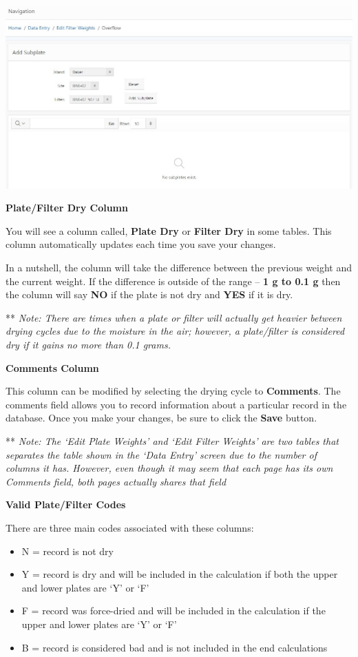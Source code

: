 \documentclass[]{book}
\providecommand{\tightlist}{%
  \setlength{\itemsep}{0pt}\setlength{\parskip}{0pt}}
\begin{document}
\includegraphics{images/Data6.jpg}

\textbf{Plate/Filter Dry Column}

You will see a column called, \textbf{Plate Dry} or \textbf{Filter Dry} in some tables. This column automatically updates each time you save your changes.

In a nutshell, the column will take the difference between the previous weight and the current weight. If the difference is outside of the range -- \textbf{1 g to 0.1 g} then the column will say \textbf{NO} if the plate is not dry and \textbf{YES} if it is dry.

** \emph{Note: There are times when a plate or filter will actually get heavier between drying cycles due to the moisture in the air; however, a plate/filter is considered dry if it gains no more than 0.1 grams.}

\textbf{Comments Column}

This column can be modified by selecting the drying cycle to \textbf{Comments}. The comments field allows you to record information about a particular record in the database. Once you make your changes, be sure to click the \textbf{Save} button.

** \emph{Note: The `Edit Plate Weights' and `Edit Filter Weights' are two tables that separates the table shown in the `Data Entry' screen due to the number of columns it has. However, even though it may seem that each page has its own Comments field, both pages actually shares that field}

\textbf{Valid Plate/Filter Codes}

There are three main codes associated with these columns:

\begin{itemize}
\tightlist
\item
  N = record is not dry\\
\item
  Y = record is dry and will be included in the calculation if both the upper and lower plates are `Y' or `F'\\
\item
  F = record was force-dried and will be included in the calculation if the upper and lower plates are `Y' or `F'\\
\item
  B = record is considered bad and is not included in the end calculations
\end{itemize}
\end{document}
